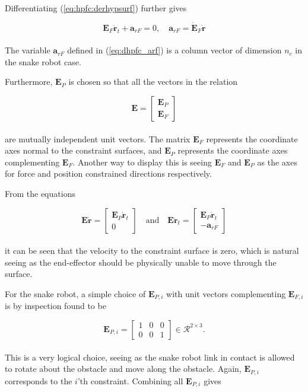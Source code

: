 Differentiating (\ref{eq:hpfc:derhypsurf}) further gives

\begin{equation}\label{eq:dhpfc_arf}
    \mathbf{E}_F \mathbf{\ddot{r}}_t + \mathbf{a}_{r F} = 0, \quad \mathbf{a}_{r F} = \mathbf{\dot{E}}_F\mathbf{\dot{r}}
\end{equation}
\\
The variable $\mathbf{a}_{r F}$ defined in (\ref{eq:dhpfc_arf}) is a column vector of dimension $n_c$ in the snake robot case.

Furthermore, $\mathbf{E}_P$ is chosen so that all the vectors in the relation

\begin{equation}\label{eq:dhpfc_E}
    \mathbf{E} =
    \begin{bmatrix}
    \mathbf{E}_P \\ \mathbf{E}_F
    \end{bmatrix}
\end{equation}
\\
are mutually independent unit vectors. The matrix $\mathbf{E}_F$ represents the coordinate axes normal to the constraint surfaces, and $\mathbf{E}_P$ represents the coordinate axes complementing $\mathbf{E}_F$. Another way to display this is seeing $\mathbf{E}_F$ and $\mathbf{E}_P$ as the axes for force and position constrained directions respectively.

From the equations

\begin{equation}
    \mathbf{E\dot{r}} =
    \begin{bmatrix}
        \mathbf{E}_P \mathbf{\dot{r}}_t\\
        0
    \end{bmatrix}
    \quad \text{and} \quad
    \mathbf{E\ddot{r}}_t =
    \begin{bmatrix}
        \mathbf{E}_P \mathbf{\ddot{r}}_t \\
        -\mathbf{a}_{r F}
    \end{bmatrix}
\end{equation}
\\
it can be seen that the velocity to the constraint surface is zero, which is natural seeing as the end-effector should be physically unable to move through the surface.

For the snake robot, a simple choice of $\mathbf{E}_{P,i}$ with unit vectors complementing $\mathbf{E}_{F,i}$ is by inspection found to be

\begin{equation}\label{eq:dhpfc_EPi}
    \mathbf{E}_{P,i} = 
    \begin{bmatrix}
        1 & 0 & 0 \\
        0 & 0 & 1
    \end{bmatrix} \in \mathcal{R}^{2\times 3}.
\end{equation}
\\
This is a very logical choice, seeing as the snake robot link in contact is allowed to rotate about the obstacle and move along the obstacle.
Again, $\mathbf{E}_{P,i}$ corresponds to the $i$'th constraint. Combining all $\mathbf{E}_{P,i}$ gives 

